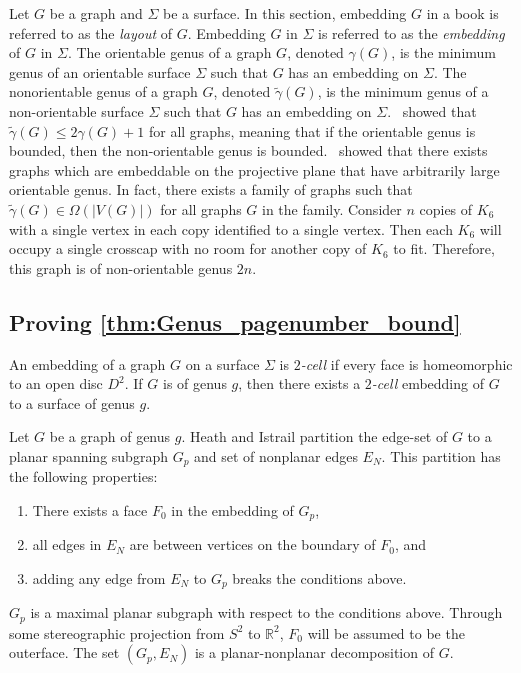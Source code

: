 Let $G$ be a graph and $\Sigma$ be a surface. In this section, embedding $G$ in a book is referred to as the \textit{layout} of $G$. Embedding $G$ in $\Sigma$ is referred to as the \textit{embedding} of $G$ in $\Sigma$. The orientable genus of a graph \(G\), denoted \(\gamma(G)\), is the minimum genus of an orientable surface $\Sigma$ such that $G$ has an embedding on $\Sigma$. The nonorientable genus of a graph \(G\), denoted \(\tilde{\gamma}(G)\), is the minimum genus of a non-orientable surface $\Sigma$ such that $G$ has an embedding on $\Sigma$.\ \textcite{moharOrientableGenusGraphs1998} showed that \(\tilde{\gamma}(G) \leq 2 \gamma(G) + 1\) for all graphs, meaning that if the orientable genus is bounded, then the non-orientable genus is bounded.\ \textcite{auslanderImbeddingGraphsManifolds1963} showed that there exists graphs which are embeddable on the projective plane that have arbitrarily large orientable genus. In fact, there exists a family of graphs such that $\tilde{\gamma}(G) \in \Omega(|V(G)|)$ for all graphs $G$ in the family. Consider $n$ copies of $K_6$ with a single vertex in each copy identified to a single vertex. Then each $K_6$ will occupy a single crosscap with no room for another copy of $K_6$ to fit. Therefore, this graph is of non-orientable genus $2n$. 

\subsection{Proving \cref{thm:Genus_pagenumber_bound}}
An embedding of a graph $G$ on a surface $\Sigma$ is \textit{$2$-cell} if every face is homeomorphic to an open disc $D^2$. If $G$ is of genus $g$, then there exists a \textit{$2$-cell} embedding of $G$ to a surface of genus $g$. 

Let $G$ be a graph of genus $g$.
Heath and Istrail partition the edge-set of \(G\) to a planar spanning subgraph \(G_p\) and set of nonplanar edges $E_N$. This partition has the following properties:
\begin{enumerate}
	\item There exists a face $F_0$ in the embedding of $G_p$,
	\item all edges in \(E_N\) are between vertices on the boundary of $F_0$, and
	\item adding any edge from $E_N$ to \(G_p\) breaks the conditions above.
\end{enumerate}
$G_p$ is a maximal planar subgraph with respect to the conditions above. Through some stereographic projection from $S^2$ to $\mathbb{R}^2$, $F_0$ will be assumed to be the outerface. The set $(G_p, E_N)$ is a planar-nonplanar decomposition of $G$. 


